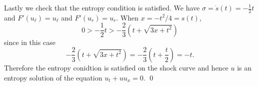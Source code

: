 Lastly we check that the entropy condition is satisfied. We have $\sigma = \dot{s}(t) =-\frac{1}{2}t$ and $F'(u_{\ell}) = u_{\ell}$ and $F'(u_{r}) = u_{r}$.
When $x = -t^{2}/4 = s(t)$,
$$0 > -\frac{1}{2}t > -\frac{2}{3}(t + \sqrt{3x + t^{2}})$$
since in this case
$$-\frac{2}{3}(t + \sqrt{3x + t^{2}}) = -\frac{2}{3}(t + \frac{t}{2}) = -t.$$
Therefore the entropy conidtion is satisfied on the shock curve and hence $u$ is an entropy solution of the equation
$u_{t} + uu_{x} = 0$.
\hfill\qed
